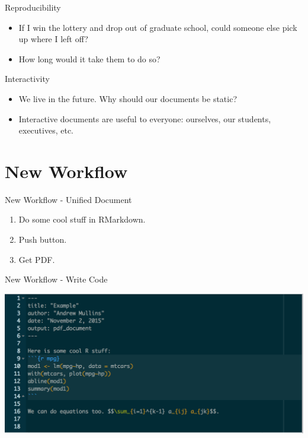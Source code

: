 \begin{frame}{Reproducibility}

\begin{itemize}
\item
  If I win the lottery and drop out of graduate school, could someone
  else pick up where I left off?
\item
  How long would it take them to do so?
\end{itemize}

\end{frame}

\begin{frame}{Interactivity}

\begin{itemize}
\item
  We live in the future. Why should our documents be static?
\item
  Interactive documents are useful to everyone: ourselves, our students,
  executives, etc.
\end{itemize}

\end{frame}

\section{New Workflow}\label{new-workflow}

\begin{frame}{New Workflow - Unified Document}

\begin{enumerate}
\def\labelenumi{\arabic{enumi}.}
\item
  Do some cool stuff in RMarkdown.
\item
  Push button.
\item
  Get PDF.
\end{enumerate}

\end{frame}

\begin{frame}{New Workflow - Write Code}

\includegraphics{images/code.png}

\end{frame}

